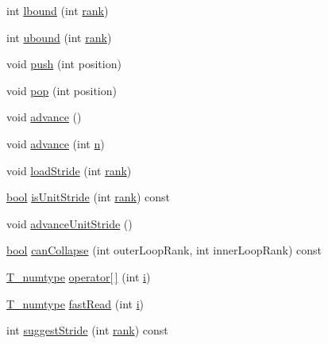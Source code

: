 \begin{DoxyCompactItemize}
\item 
int \hyperlink{class__bz__FunctorExpr_ac1f0bf6b6821b8498d31c00252eba9b9}{lbound} (int \hyperlink{class__bz__FunctorExpr_a34e5b88b9c07345c11118510630102ce}{rank})
\item 
int \hyperlink{class__bz__FunctorExpr_a01ccca74bfef527b59046f53c438944e}{ubound} (int \hyperlink{class__bz__FunctorExpr_a34e5b88b9c07345c11118510630102ce}{rank})
\item 
void \hyperlink{class__bz__FunctorExpr_a2cf62162e8b916976844afe19c057446}{push} (int position)
\item 
void \hyperlink{class__bz__FunctorExpr_a3f1f752ec4273e91998c3e6b4ea9aa68}{pop} (int position)
\item 
void \hyperlink{class__bz__FunctorExpr_a7b7cfcd9130081434a9e6f7021e82387}{advance} ()
\item 
void \hyperlink{class__bz__FunctorExpr_a6aa484a3d581c960ca49727b5d5b8cc4}{advance} (int \hyperlink{indexexpr_8h_ab427e2e2b4d6cec55fa088ea2a692ace}{n})
\item 
void \hyperlink{class__bz__FunctorExpr_a098d41e4c076e139647d9bd9ba6cd139}{load\+Stride} (int \hyperlink{class__bz__FunctorExpr_a34e5b88b9c07345c11118510630102ce}{rank})
\item 
\hyperlink{compiler_8h_abb452686968e48b67397da5f97445f5b}{bool} \hyperlink{class__bz__FunctorExpr_a344a5a94910d1d4054258cd2f6b82da8}{is\+Unit\+Stride} (int \hyperlink{class__bz__FunctorExpr_a34e5b88b9c07345c11118510630102ce}{rank}) const 
\item 
void \hyperlink{class__bz__FunctorExpr_a228dc490bce5f154b510f770034969ac}{advance\+Unit\+Stride} ()
\item 
\hyperlink{compiler_8h_abb452686968e48b67397da5f97445f5b}{bool} \hyperlink{class__bz__FunctorExpr_a0c7d36cceb1e2cda6254d9ccf074bd64}{can\+Collapse} (int outer\+Loop\+Rank, int inner\+Loop\+Rank) const 
\item 
\hyperlink{class__bz__FunctorExpr_a4adadf2cfc27ce07971936d0b3d5ca65}{T\+\_\+numtype} \hyperlink{class__bz__FunctorExpr_aed1480897c56f90272aa06bc6ffca050}{operator\mbox{[}$\,$\mbox{]}} (int \hyperlink{indexexpr_8h_aabd77643995707c185e95c8cb2782c81}{i})
\item 
\hyperlink{class__bz__FunctorExpr_a4adadf2cfc27ce07971936d0b3d5ca65}{T\+\_\+numtype} \hyperlink{class__bz__FunctorExpr_ad563f6d53f1fcc5589e552e5a54c1964}{fast\+Read} (int \hyperlink{indexexpr_8h_aabd77643995707c185e95c8cb2782c81}{i})
\item 
int \hyperlink{class__bz__FunctorExpr_a23cc821fb5908d1b1fefaa7ae8a0989d}{suggest\+Stride} (int \hyperlink{class__bz__FunctorExpr_a34e5b88b9c07345c11118510630102ce}{rank}) const 

\end{DoxyCompactItemize}

